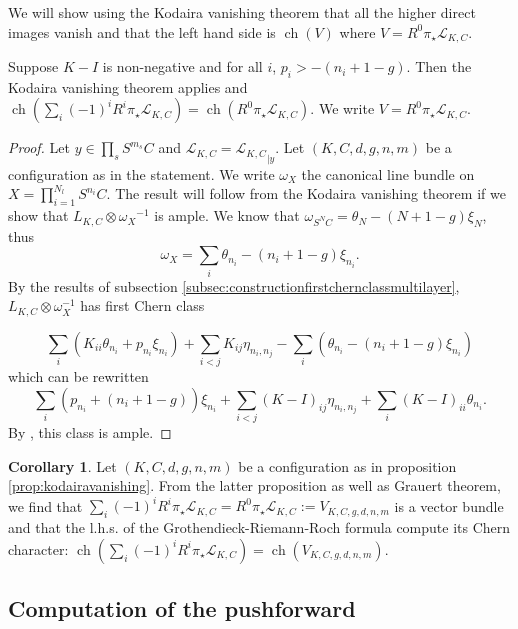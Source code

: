 \documentclass{article}
\theoremstyle{definition}
\newtheorem{corollary}{Corollary}
\DeclareMathOperator{\ch}{ch}
\begin{document}
We will show using the Kodaira vanishing theorem that all the higher direct images vanish and that the left hand side is $\ch(V)$ where $V=R^0 \pi_\star \mathcal{L}_{K,C}$.

\begin{proposition}
\label{prop:kodairavanishing}
Suppose $K-I$ is non-negative and for all $i$, $p_i>-(n_i+1-g)$. Then the Kodaira vanishing theorem applies and $\ch\left(\sum_i (-1)^iR^i \pi_\star \mathcal{L}_{K,C}\right)=\ch\left( R^0 \pi_\star \mathcal{L}_{K,C}\right)$. We write $V=R^0 \pi_\star \mathcal{L}_{K,C}$.    
\end{proposition}



\begin{proof}
Let $y \in \prod_s S^{m_s}C$ and $\mathcal{L}_{K,C}={\mathcal{L}_{K,C}}_{|y}$. Let $(K,C,d,g,n,m)$ be a configuration as in the statement. We write $\omega_X$ the canonical line bundle on $X=\prod_{i=1}^{{N_l}}S^{n_i}C$.
The result will follow from the Kodaira vanishing theorem if we show that $L_{K,C} \otimes {\omega_X}^{-1}$ is ample. We know that $\omega_{S^NC}=\theta_N-(N+1-g)\xi_N$, thus 
$$\omega_X=\sum_i \theta_{n_i}-(n_i+1-g)\xi_{n_i}.$$
By the results of subsection \ref{subsec:constructionfirstchernclassmultilayer}, $L_{K,C} \otimes \omega_X^{-1}$ has first Chern class


$$\sum_{i} (K_{ii}  \theta_{n_i}  + p_{n_i} \xi_{n_i} )+\sum_{i<j} K_{ij} \eta_{n_i,n_j} - \sum_i \left(\theta_{n_i} -(n_i+1-g) \xi_{n_i} \right)$$ which can be rewritten
$$\sum_{i}(p_{n_i}+(n_i+1-g)) \xi_{n_i} + \sum_{i<j} (K-I)_{ij} \eta_{n_i,n_j} + \sum_i (K-I)_{ii} \theta_{n_i} .$$ By \cite[Prop. 4.1.3]{Aldonza_Dupont_2025}, this class is ample.

\end{proof}

\begin{corollary}
\label{corr:kodaira}
    Let $(K,C,d,g,n,m)$ be a configuration as in proposition \ref{prop:kodairavanishing}. From the latter proposition as well as Grauert theorem, we find that $\sum_i (-1)^iR^i \pi_\star \mathcal{L}_{K,C}=R^0 \pi_\star \mathcal{L}_{K,C} :=V_{K,C,g,d,n,m} $ is a vector bundle and that the l.h.s. of the Grothendieck-Riemann-Roch formula compute its Chern character: $\ch\left(\sum_i (-1)^iR^i \pi_\star \mathcal{L}_{K,C}\right)=\ch(V_{K,C,g,d,n,m})$.
\end{corollary}




\subsection{Computation of the pushforward}
\end{document}
